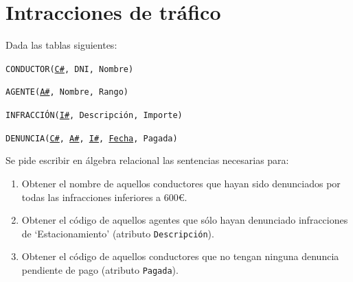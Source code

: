 \documentclass[a4paper]{article}
\begin{document}
\section{Intracciones de tráfico}

Dada las tablas siguientes:

\texttt{CONDUCTOR(\underline{C\#}, DNI, Nombre)}

\texttt{AGENTE(\underline{A\#}, Nombre, Rango)}

\texttt{INFRACCIÓN(\underline{I\#}, Descripción, Importe)}

\texttt{DENUNCIA(\underline{C\#}, \underline{A\#}, \underline{I\#}, \underline{Fecha}, Pagada)}

Se pide escribir en álgebra relacional las sentencias necesarias para:

\begin{enumerate}
    \item Obtener el nombre de aquellos conductores que hayan sido denunciados por todas las infracciones inferiores a 600€.
    \item Obtener el código de aquellos agentes que sólo hayan denunciado infracciones de `Estacionamiento' (atributo \texttt{Descripción}).
    \item Obtener el código de aquellos conductores que no tengan ninguna denuncia pendiente de pago (atributo \texttt{Pagada}).
\end{enumerate}
\end{document}
